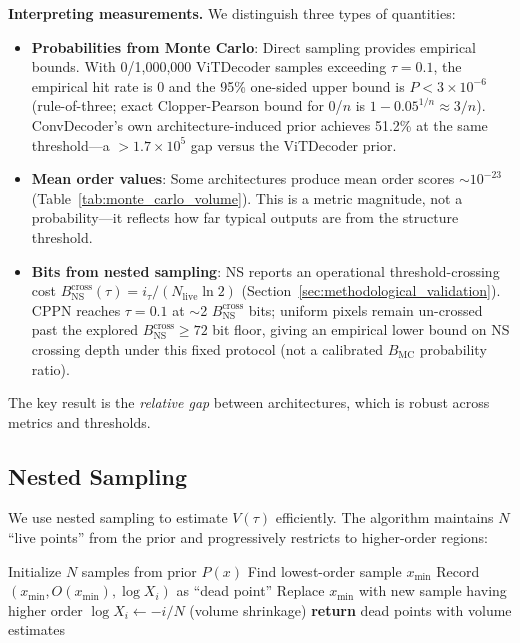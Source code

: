 \documentclass{article}
\begin{document}
\textbf{Interpreting measurements.} We distinguish three types of quantities:
\begin{itemize}[leftmargin=0.5cm, topsep=2pt, itemsep=2pt]
    \item \textbf{Probabilities from Monte Carlo}: Direct sampling provides empirical bounds. With 0/1,000,000 ViTDecoder samples exceeding $\tau=0.1$, the empirical hit rate is 0 and the 95\% one-sided upper bound is $P < 3\times 10^{-6}$ (rule-of-three; exact Clopper-Pearson bound for 0/$n$ is $1-0.05^{1/n}\approx 3/n$). ConvDecoder's own architecture-induced prior achieves 51.2\% at the same threshold---a $>1.7\times 10^{5}$ gap versus the ViTDecoder prior.
    \item \textbf{Mean order values}: Some architectures produce mean order scores $\sim 10^{-23}$ (Table~\ref{tab:monte_carlo_volume}). This is a metric magnitude, not a probability---it reflects how far typical outputs are from the structure threshold.
    \item \textbf{Bits from nested sampling}: NS reports an operational threshold-crossing cost $B_{\text{NS}}^{\text{cross}}(\tau)=i_\tau/(N_{\text{live}}\ln 2)$ (Section~\ref{sec:methodological_validation}). CPPN reaches $\tau=0.1$ at $\sim$2 $B_{\text{NS}}^{\text{cross}}$ bits; uniform pixels remain un-crossed past the explored $B_{\text{NS}}^{\text{cross}} \ge 72$ bit floor, giving an empirical lower bound on NS crossing depth under this fixed protocol (not a calibrated $B_{\text{MC}}$ probability ratio).
\end{itemize}
The key result is the \emph{relative gap} between architectures, which is robust across metrics and thresholds.

\subsection{Nested Sampling}

We use nested sampling \cite{skilling2006nested} to estimate $V(\tau)$ efficiently. The algorithm maintains $N$ ``live points'' from the prior and progressively restricts to higher-order regions:

\begin{algorithm}
\caption{Nested Sampling for Structure Density}
\begin{algorithmic}
\STATE Initialize $N$ samples from prior $P(x)$
    \STATE Find lowest-order sample $x_{\min}$
    \STATE Record $(x_{\min}, O(x_{\min}), \log X_i)$ as ``dead point''
    \STATE Replace $x_{\min}$ with new sample having higher order
    \STATE $\log X_i \leftarrow -i/N$ (volume shrinkage)
\ENDFOR
\STATE \textbf{return} dead points with volume estimates
\end{algorithmic}
\end{algorithm}
\end{document}
